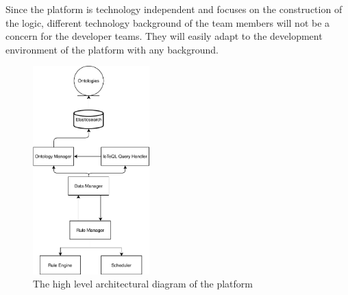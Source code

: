 Since the platform is technology independent and focuses on the construction of the logic, different technology background of the team members will not be a concern for the developer teams. They will easily adapt to the development environment of the platform with any background.
\begin{figure}[H]
  \centering
  \includegraphics[width=0.4\textwidth,height=\textheight,keepaspectratio]{figures/high_level_architectural_diagram.pdf}
  \caption[Platform Architecture]{The high level architectural diagram of the platform}\label{fig:architecture}
\end{figure}

